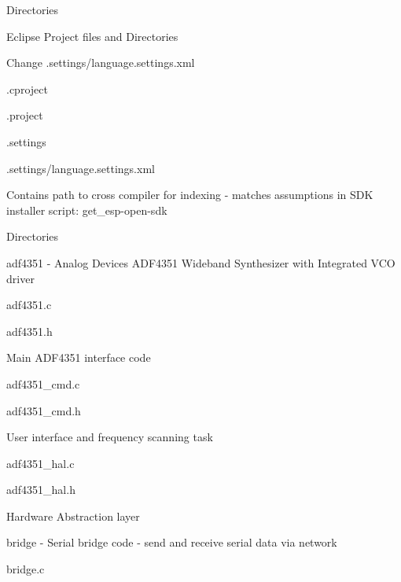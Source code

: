 \begin{DoxyParagraph}{Directories}
\begin{DoxyItemize}
\begin{DoxyItemize}
\begin{DoxyItemize}
\end{DoxyItemize}
\end{DoxyItemize}
\item Eclipse Project files and Directories
\begin{DoxyItemize}
\item Change .settings/language.\+settings.\+xml
\item .cproject
\item .project
\item .settings
\begin{DoxyItemize}
\item .settings/language.\+settings.\+xml
\begin{DoxyItemize}
\item Contains path to cross compiler for indexing -\/ matches assumptions in S\+DK installer script\+: get\+\_\+esp-\/open-\/sdk
\end{DoxyItemize}
\end{DoxyItemize}
\end{DoxyItemize}
\item Directories
\begin{DoxyItemize}
\item adf4351 -\/ Analog Devices A\+D\+F4351 Wideband Synthesizer with Integrated V\+CO driver
\begin{DoxyItemize}
\item adf4351.\+c
\item adf4351.\+h
\begin{DoxyItemize}
\item Main A\+D\+F4351 interface code
\end{DoxyItemize}
\item adf4351\+\_\+cmd.\+c
\item adf4351\+\_\+cmd.\+h
\begin{DoxyItemize}
\item User interface and frequency scanning task
\end{DoxyItemize}
\item adf4351\+\_\+hal.\+c
\item adf4351\+\_\+hal.\+h
\begin{DoxyItemize}
\item Hardware Abstraction layer
\end{DoxyItemize}
\end{DoxyItemize}
\item bridge -\/ Serial bridge code -\/ send and receive serial data via network
\begin{DoxyItemize}
\item bridge.\+c

\end{DoxyItemize}
\end{DoxyItemize}
\end{DoxyItemize}
\end{DoxyParagraph}
